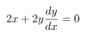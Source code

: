 \documentclass[preview]{standalone}
\begin{document}
\begin{align*}
2x + 2y {dy \over dx} = 0
\end{align*}
\end{document}
